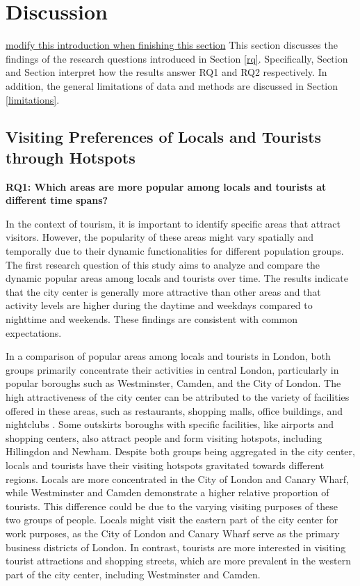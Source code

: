 \documentclass{article}
\theoremstyle{remark}
\begin{document}
\section{Discussion}
\underline{modify this introduction when finishing this section}
This section discusses the findings of the research questions introduced in Section \ref{rq}. Specifically, Section \label{discussion_rq1} and Section \label{discussion_rq2} interpret how the results answer RQ1 and RQ2 respectively. In addition, the general limitations of data and methods are discussed in Section \ref{limitations}.

\subsection{Visiting Preferences of Locals and Tourists through Hotspots} \label{discussion_rq1}
\textbf{RQ1: Which areas are more popular among locals and tourists at different time spans?}

In the context of tourism, it is important to identify specific areas that attract visitors. However, the popularity of these areas might vary spatially and temporally due to their dynamic functionalities for different population groups. The first research question of this study aims to analyze and compare the dynamic popular areas among locals and tourists over time. The results indicate that the city center is generally more attractive than other areas and that activity levels are higher during the daytime and weekdays compared to nighttime and weekends. These findings are consistent with common expectations.

In a comparison of popular areas among locals and tourists in London, both groups primarily concentrate their activities in central London, particularly in popular boroughs such as Westminster, Camden, and the City of London. The high attractiveness of the city center can be attributed to the variety of facilities offered in these areas, such as restaurants, shopping malls, office buildings, and nightclubs \citep{lau_understanding_2006}. Some outskirts boroughs with specific facilities, like airports and shopping centers, also attract people and form visiting hotspots, including Hillingdon and Newham. Despite both groups being aggregated in the city center, locals and tourists have their visiting hotspots gravitated towards different regions. Locals are more concentrated in the City of London and Canary Wharf, while Westminster and Camden demonstrate a higher relative proportion of tourists. This difference could be due to the varying visiting purposes of these two groups of people. Locals might visit the eastern part of the city center for work purposes, as the City of London and Canary Wharf serve as the primary business districts of London. In contrast, tourists are more interested in visiting tourist attractions and shopping streets, which are more prevalent in the western part of the city center, including Westminster and Camden.
\end{document}
